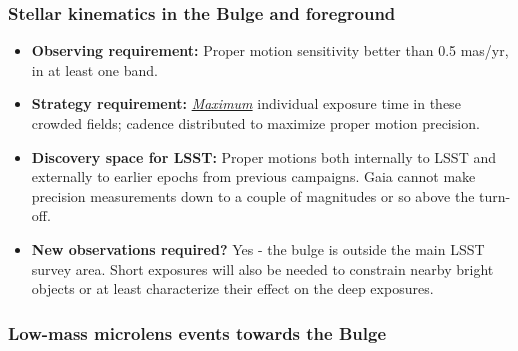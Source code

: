 \subsubsection{Stellar kinematics in the Bulge and foreground}
\vspace{-2mm}
\begin{itemize}
\item {\bf Observing requirement:} Proper motion sensitivity better than 0.5 mas/yr, in at least one band.
\vspace{-2mm}

\item {\bf Strategy requirement:} \underline{\it Maximum} individual exposure time in these crowded fields; cadence distributed to maximize proper motion precision.
\vspace{-2mm}

\item {\bf Discovery space for LSST:} Proper motions both internally to LSST and externally to earlier epochs from previous campaigns. Gaia cannot make precision measurements down to a couple of magnitudes or so above the turn-off.
\vspace{-2mm}

\item {\bf New observations required?} Yes - the bulge is outside the main LSST survey area. Short exposures will also be needed to constrain nearby bright objects or at least characterize their effect on the deep exposures.
\vspace{-2mm}
\end{itemize}

\subsubsection{Low-mass microlens events towards the Bulge}

